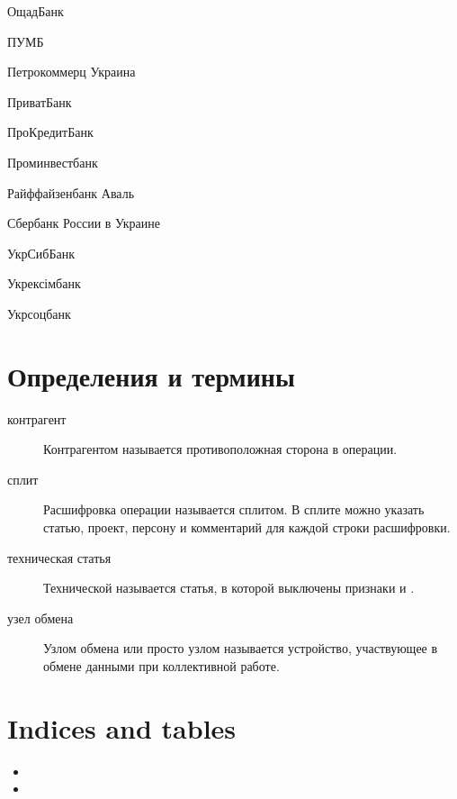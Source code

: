 \documentclass[a4paper,10pt,russian]{sphinxmanual}
\begin{document}
ОщадБанк

ПУМБ

Петрокоммерц Украина

ПриватБанк

ПроКредитБанк

Проминвестбанк

Райффайзенбанк Аваль

Сбербанк России в Украине

УкрСибБанк

Укрексімбанк

Укрсоцбанк


\chapter{Определения и термины}
\label{\detokenize{glossary:chapter-index}}\label{\detokenize{glossary:id1}}\label{\detokenize{glossary::doc}}\begin{description}
\item[{контрагент\label{\detokenize{glossary:term-2}}}] \leavevmode
Контрагентом называется противоположная сторона в операции.

\item[{сплит\label{\detokenize{glossary:term}}}] \leavevmode
Расшифровка операции называется сплитом. В сплите можно указать статью, проект, персону и комментарий
для каждой строки расшифровки.

\item[{техническая статья\label{\detokenize{glossary:term-3}}}] \leavevmode
Технической называется статья, в которой выключены признаки  и .

\item[{узел обмена\label{\detokenize{glossary:term-1}}}] \leavevmode
Узлом обмена или просто узлом называется устройство, участвующее в обмене данными при коллективной работе.

\end{description}


\chapter{Indices and tables}
\label{\detokenize{index:indices-and-tables}}\begin{itemize}
\item {} 

\item {} 

\end{itemize}



\renewcommand{\indexname}{Алфавитный указатель}
\printindex
\end{document}

